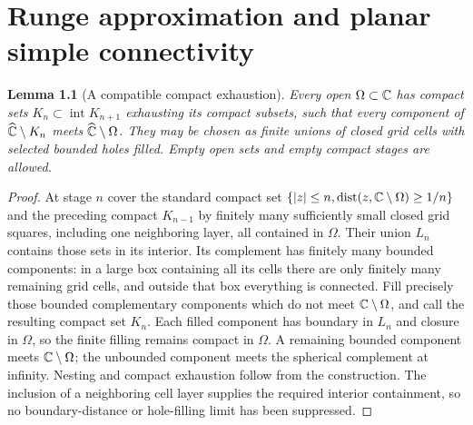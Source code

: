 \documentclass[11pt,a4paper,openany]{book}
\newtheorem{lemma}[theorem]{Lemma}
\theoremstyle{definition}
\theoremstyle{remark}\newtheorem{remark}[theorem]{Remark}
\DeclareMathOperator{\dist}{dist}\DeclareMathOperator{\ord}{ord}
\newcommand{\family}[1]{}
\begin{document}

\chapter{Runge approximation and planar simple connectivity}\label{ch:d12-15}

\begin{lemma}[A compatible compact exhaustion]\family{D12.15.01}\label{d12:15-01}
Every open $\Omega\subset\mathbb C$ has compact sets $K_n\subset\operatorname{int}K_{n+1}$ exhausting its compact subsets, such that every component of $\widehat{\mathbb C}\setminus K_n$ meets $\widehat{\mathbb C}\setminus\Omega$. They may be chosen as finite unions of closed grid cells with selected bounded holes filled. Empty open sets and empty compact stages are allowed.
\end{lemma}
\begin{proof}
At stage $n$ cover the standard compact set $\{|z|\le n,\dist(z,\C\setminus\Omega)\ge1/n\}$ and the preceding compact $K_{n-1}$ by finitely many sufficiently small closed grid squares, including one neighboring layer, all contained in $\Omega$. Their union $L_n$ contains those sets in its interior. Its complement has finitely many bounded components: in a large box containing all its cells there are only finitely many remaining grid cells, and outside that box everything is connected. Fill precisely those bounded complementary components which do not meet $\mathbb C\setminus\Omega$, and call the resulting compact set $K_n$. Each filled component has boundary in $L_n$ and closure in $\Omega$, so the finite filling remains compact in $\Omega$. A remaining bounded component meets $\mathbb C\setminus\Omega$; the unbounded component meets the spherical complement at infinity. Nesting and compact exhaustion follow from the construction. The inclusion of a neighboring cell layer supplies the required interior containment, so no boundary-distance or hole-filling limit has been suppressed.
\end{proof}
\end{document}
